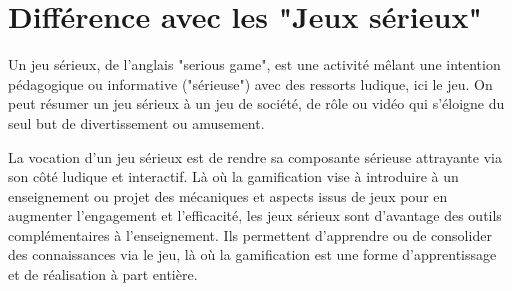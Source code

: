 \section{Différence avec les "Jeux sérieux"}
Un jeu sérieux, de l'anglais "serious game", est une activité mêlant une intention pédagogique ou informative ("sérieuse") avec des ressorts ludique, ici le jeu. On peut résumer un jeu sérieux à un jeu de société, de rôle ou vidéo qui s'éloigne du seul but de divertissement ou amusement. \par
La vocation d'un jeu sérieux est de rendre sa composante sérieuse attrayante via son côté ludique et interactif. Là où la gamification vise à introduire à un enseignement ou projet des mécaniques et aspects issus de jeux pour en augmenter l'engagement et l'efficacité, les jeux sérieux sont d'avantage des outils complémentaires à l'enseignement. Ils permettent d'apprendre ou de consolider des connaissances via le jeu, là où la gamification est une forme d'apprentissage et de réalisation à part entière.